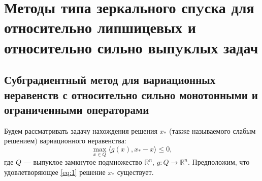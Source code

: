 \chapter{Методы типа зеркального спyска для относительно липшицевых и относительно сильно выпyклых задач}\label{ch:ch1}

\section{Субградиентный метод для вариационных неравенств с относительно сильно монотонными и ограниченными операторами}\label{section_2}

Будем рассматривать задачу нахождения решения $x_*$ (также называемого слабым решением) вариационного неравенства: 
\begin{equation}\label{eq:1}
\max_{x \in Q} \langle g(x), x_* - x \rangle \leq 0,
\end{equation}
где $Q$ --- выпуклое замкнутое подмножество $\mathbb{R}^n$,
$g: Q \longrightarrow \mathbb{R}^n$. Предположим, что удовлетворяющее \eqref{eq:1} решение $x_*$ существует.

